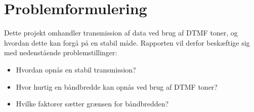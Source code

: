 \newpage
\section{Problemformulering}
Dette projekt omhandler transmission af data ved brug af DTMF toner, og hvordan dette kan forgå på en stabil måde. Rapporten vil derfor beskæftige sig med nedenstående problemstillinger:

\begin{itemize}[noitemsep]
	\item	Hvordan opnås en stabil transmission?
	\item	Hvor hurtig en båndbredde kan opnås ved brug af DTMF toner?
	\item   Hvilke faktorer sætter grænsen for båndbredden?

\end{itemize}
